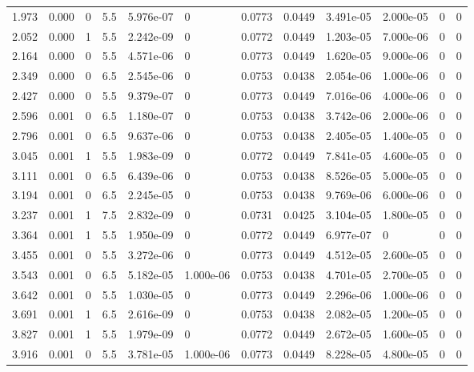 \documentclass[preview]{standalone}
\begin{document}
{{\begin{tabular}{L{1.2cm}C{1.2cm} C{0.3cm}C{0.5cm} C{1.4cm}C{1.4cm} C{1.4cm}C{1.4cm} C{1.6cm}C{1.6cm} C{1.6cm}C{1.6cm}}
  1.973  &  0.000  & 0     & 5.5 &  5.976e-07  & 0  &  0.0773&   0.0449& 3.491e-05 & 2.000e-05   &  0 & 0  \\ 
  2.052  &  0.000  & 1     & 5.5 &  2.242e-09  & 0  &  0.0772&   0.0449& 1.203e-05 & 7.000e-06   &  0 & 0  \\ 
  2.164  &  0.000  & 0     & 5.5 &  4.571e-06  & 0  &  0.0773&   0.0449& 1.620e-05 & 9.000e-06   &  0 & 0  \\ 
  2.349  &  0.000  & 0     & 6.5 &  2.545e-06  & 0  &  0.0753&   0.0438& 2.054e-06 & 1.000e-06   &  0 & 0  \\ 
  2.427  &  0.000  & 0     & 5.5 &  9.379e-07  & 0  &  0.0773&   0.0449& 7.016e-06 & 4.000e-06   &  0 & 0  \\ 
  2.596  &  0.001  & 0     & 6.5 &  1.180e-07  & 0  &  0.0753&   0.0438& 3.742e-06 & 2.000e-06   &  0 & 0  \\ 
  2.796  &  0.001  & 0     & 6.5 &  9.637e-06  & 0  &  0.0753&   0.0438& 2.405e-05 & 1.400e-05   &  0 & 0  \\ 
  3.045  &  0.001  & 1     & 5.5 &  1.983e-09  & 0  &  0.0772&   0.0449& 7.841e-05 & 4.600e-05   &  0 & 0  \\ 
  3.111  &  0.001  & 0     & 6.5 &  6.439e-06  & 0  &  0.0753&   0.0438& 8.526e-05 & 5.000e-05   &  0 & 0  \\ 
  3.194  &  0.001  & 0     & 6.5 &  2.245e-05  & 0  &  0.0753&   0.0438& 9.769e-06 & 6.000e-06   &  0 & 0  \\ 
  3.237  &  0.001  & 1     & 7.5 &  2.832e-09  & 0  &  0.0731&   0.0425& 3.104e-05 & 1.800e-05   &  0 & 0  \\ 
  3.364  &  0.001  & 1     & 5.5 &  1.950e-09  & 0  &  0.0772&   0.0449& 6.977e-07 & 0   &  0 & 0  \\ 
  3.455  &  0.001  & 0     & 5.5 &  3.272e-06  & 0  &  0.0773&   0.0449& 4.512e-05 & 2.600e-05   &  0 & 0  \\ 
  3.543  &  0.001  & 0     & 6.5 &  5.182e-05  & 1.000e-06  &  0.0753&   0.0438& 4.701e-05 & 2.700e-05   &  0 & 0  \\ 
  3.642  &  0.001  & 0     & 5.5 &  1.030e-05  & 0  &  0.0773&   0.0449& 2.296e-06 & 1.000e-06   &  0 & 0  \\ 
  3.691  &  0.001  & 1     & 6.5 &  2.616e-09  & 0  &  0.0753&   0.0438& 2.082e-05 & 1.200e-05   &  0 & 0  \\ 
  3.827  &  0.001  & 1     & 5.5 &  1.979e-09  & 0  &  0.0772&   0.0449& 2.672e-05 & 1.600e-05   &  0 & 0  \\ 
  3.916  &  0.001  & 0     & 5.5 &  3.781e-05  & 1.000e-06  &  0.0773&   0.0449& 8.228e-05 & 4.800e-05   &  0 & 0  \\ 

\end{tabular}}}
\end{document}
